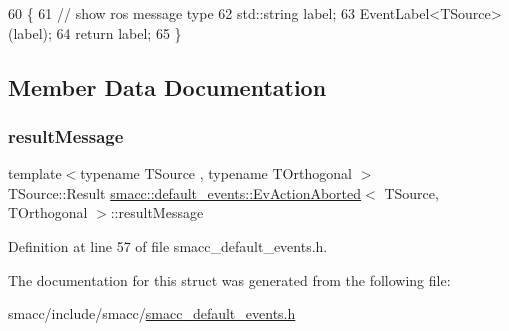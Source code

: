 \begin{DoxyCode}
60   \{
61     \textcolor{comment}{// show ros message type}
62     std::string label;
63     EventLabel<TSource>(label);
64     \textcolor{keywordflow}{return} label;
65   \}
\end{DoxyCode}


\subsection{Member Data Documentation}
\mbox{\label{structsmacc_1_1default__events_1_1EvActionAborted_a542b6df003c242f61775aa1d8921d945}} 
\subsubsection{\texorpdfstring{result\+Message}{resultMessage}}
{\footnotesize\ttfamily template$<$typename T\+Source , typename T\+Orthogonal $>$ \\
T\+Source\+::\+Result \hyperlink{structsmacc_1_1default__events_1_1EvActionAborted}{smacc\+::default\+\_\+events\+::\+Ev\+Action\+Aborted}$<$ T\+Source, T\+Orthogonal $>$\+::result\+Message}



Definition at line 57 of file smacc\+\_\+default\+\_\+events.\+h.



The documentation for this struct was generated from the following file\+:\begin{DoxyCompactItemize}
\item 
smacc/include/smacc/\hyperlink{smacc__default__events_8h}{smacc\+\_\+default\+\_\+events.\+h}\end{DoxyCompactItemize}
